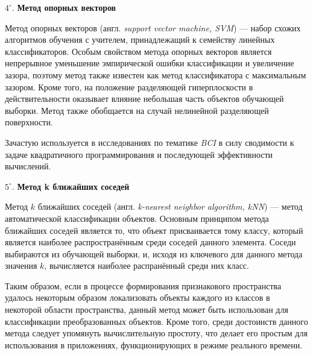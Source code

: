 \documentclass[12pt,fleqn]{article}
\begin{document}
	\par $4^{\circ}.$ {\bf Метод опорных векторов}
	\par Метод опорных векторов (англ. {\it support vector machine, SVM}) — набор схожих алгоритмов обучения с учителем, принадлежащий к семейству линейных классификаторов. Особым свойством метода опорных векторов является непрерывное уменьшение эмпирической ошибки классификации и увеличение зазора, поэтому метод также известен как метод классификатора с максимальным зазором. Кроме того, на положение разделяющей гиперплоскости в действительности оказывает влияние небольшая часть объектов обучающей выборки. Метод также обобщается на случай нелинейной разделяющей поверхности.
	\par Зачастую используется в исследованиях по тематике {\it BCI} в силу сводимости к задаче квадратичного программирования и последующей эффективности вычислений.
	\par $5^{\circ}.$ {\bf Метод k ближайших соседей}
	\par Метод $k$ ближайших соседей (англ. {\it k-nearest neighbor algorithm, kNN}) — метод автоматической классификации объектов. Основным принципом метода ближайших соседей является то, что объект присваивается тому классу, который является наиболее распространённым среди соседей данного элемента. Соседи выбираются из обучающей выборки, и, исходя из ключевого для данного метода значения $k$, вычисляется наиболее распранённый среди них класс.
	\par Таким образом, если в процессе формирования признакового пространства удалось некоторым образом локализовать объекты каждого из классов в некоторой области пространства, данный метод может быть использован для классификации преобразованных объектов. Кроме того, среди достоинств данного метода следует упомянуть вычислительную простоту, что делает его простым для использования в приложениях, функционирующих в режиме реального времени.
\end{document}
